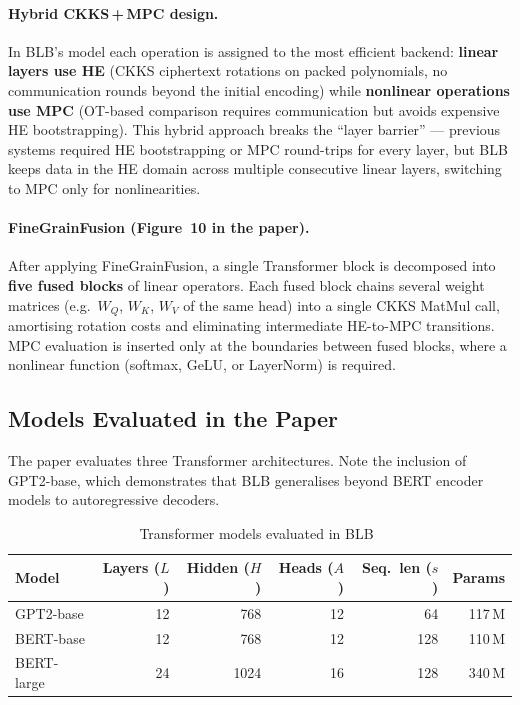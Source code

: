 \paragraph{Hybrid CKKS\,+\,MPC design.}
In BLB's model each operation is assigned to the most efficient backend:
\textbf{linear layers use HE} (CKKS ciphertext rotations on packed polynomials, no communication rounds beyond the initial encoding) while
\textbf{nonlinear operations use MPC} (OT-based comparison requires communication but avoids expensive HE bootstrapping).
This hybrid approach breaks the ``layer barrier'' --- previous systems required HE bootstrapping or MPC round-trips for every layer, but BLB keeps data in the HE domain across multiple consecutive linear layers, switching to MPC only for nonlinearities.

\paragraph{FineGrainFusion (Figure~10 in the paper).}
After applying FineGrainFusion, a single Transformer block is decomposed into \textbf{five fused blocks} of linear operators.
Each fused block chains several weight matrices (e.g.\ $W_Q$, $W_K$, $W_V$ of the same head) into a single CKKS MatMul call, amortising rotation costs and eliminating intermediate HE-to-MPC transitions.
MPC evaluation is inserted only at the boundaries between fused blocks, where a nonlinear function (softmax, GeLU, or LayerNorm) is required.

\subsection{Models Evaluated in the Paper}\label{ssec:models}

The paper evaluates three Transformer architectures.
Note the inclusion of GPT2-base, which demonstrates that BLB generalises beyond BERT encoder models to autoregressive decoders.

\begin{table}[ht]
\centering
\caption{Transformer models evaluated in BLB~\cite{xu2025breaking}}
\label{tab:model-variants}
\begin{tabular}{lrrrrr}
\toprule
\textbf{Model} & \textbf{Layers} ($L$) & \textbf{Hidden} ($H$) & \textbf{Heads} ($A$) & \textbf{Seq.\ len} ($s$) & \textbf{Params} \\
\midrule
GPT2-base   & 12 & 768  & 12 & 64  & 117\,M \\
BERT-base   & 12 & 768  & 12 & 128 & 110\,M \\
BERT-large  & 24 & 1024 & 16 & 128 & 340\,M \\
\bottomrule
\end{tabular}
\end{table}

